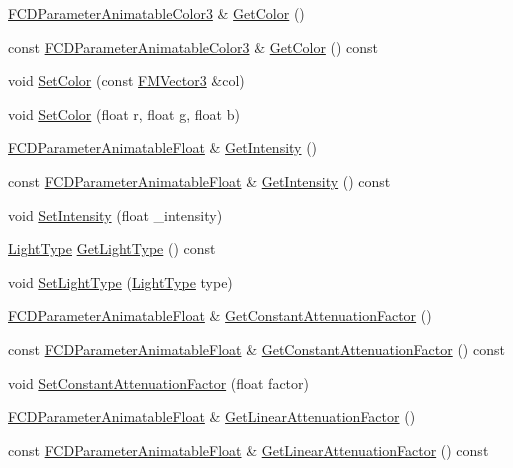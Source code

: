 \begin{DoxyCompactItemize}
\item 
\hyperlink{classFCDParameterAnimatableT}{FCDParameterAnimatableColor3} \& \hyperlink{classFCDLight_a8b7c9d40d5fb2380b695bbb13acf7700}{GetColor} ()
\item 
const \hyperlink{classFCDParameterAnimatableT}{FCDParameterAnimatableColor3} \& \hyperlink{classFCDLight_ad1dac1ef4662b5848641e9effb782fe9}{GetColor} () const 
\item 
void \hyperlink{classFCDLight_ae0391538fa3a7e801bf1a67376b99849}{SetColor} (const \hyperlink{classFMVector3}{FMVector3} \&col)
\item 
void \hyperlink{classFCDLight_a5f1bf45318a9c58ab16e2617ac3151a7}{SetColor} (float r, float g, float b)
\item 
\hyperlink{classFCDParameterAnimatableT}{FCDParameterAnimatableFloat} \& \hyperlink{classFCDLight_ad5ec2806163a582d5e03e48b8a45e4c9}{GetIntensity} ()
\item 
const \hyperlink{classFCDParameterAnimatableT}{FCDParameterAnimatableFloat} \& \hyperlink{classFCDLight_a16c3d05bff3f7abb521e560ef48d0d04}{GetIntensity} () const 
\item 
void \hyperlink{classFCDLight_a5805489e21bcaa487fe165b1e23c48c9}{SetIntensity} (float \_\-intensity)
\item 
\hyperlink{classFCDLight_a358eac688b4a74aa90531e5206e92e60}{LightType} \hyperlink{classFCDLight_aa6a7002af06c8663e083390a8497bc88}{GetLightType} () const 
\item 
void \hyperlink{classFCDLight_af1d0df3b52fd2bc9d19ccc9f7e8f1b2b}{SetLightType} (\hyperlink{classFCDLight_a358eac688b4a74aa90531e5206e92e60}{LightType} type)
\item 
\hyperlink{classFCDParameterAnimatableT}{FCDParameterAnimatableFloat} \& \hyperlink{classFCDLight_aea02a8559a510bbeca4f72afaa8e8f22}{GetConstantAttenuationFactor} ()
\item 
const \hyperlink{classFCDParameterAnimatableT}{FCDParameterAnimatableFloat} \& \hyperlink{classFCDLight_a20e469466a910905e4f81e3256befe8a}{GetConstantAttenuationFactor} () const 
\item 
void \hyperlink{classFCDLight_aacb2ad42d6e14393e1016866f2fb90fa}{SetConstantAttenuationFactor} (float factor)
\item 
\hyperlink{classFCDParameterAnimatableT}{FCDParameterAnimatableFloat} \& \hyperlink{classFCDLight_afa5378f4371d9cd543cac259b8ab7378}{GetLinearAttenuationFactor} ()
\item 
const \hyperlink{classFCDParameterAnimatableT}{FCDParameterAnimatableFloat} \& \hyperlink{classFCDLight_a14aa36a91c0bcc3a93ffa2ff78e7b835}{GetLinearAttenuationFactor} () const 

\end{DoxyCompactItemize}
